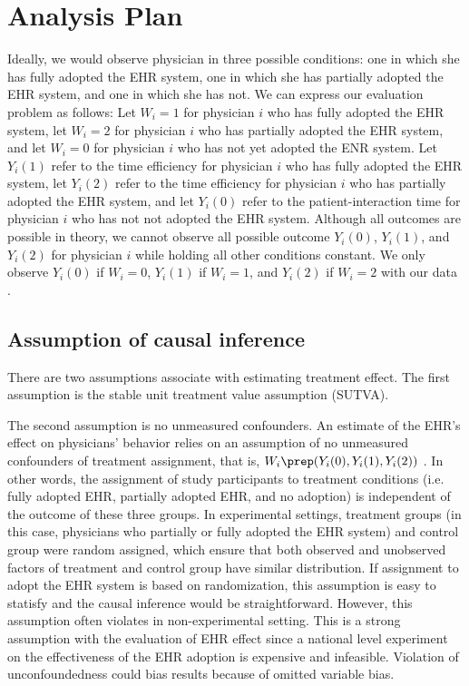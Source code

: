 \section{Analysis Plan}
Ideally, we would observe physician in three possible conditions: one in which she has fully adopted the EHR system, one in which she has partially adopted the EHR system, and one in which she has not. We can express our evaluation problem as follows: Let $W_i = 1$ for physician $i$ who has fully adopted the EHR system, let $W_i = 2$ for physician $i$ who has partially adopted the EHR system, and let $W_i = 0$ for physician $i$ who has not yet adopted the ENR system. Let $Y_i(1)$ refer to the time efficiency for physician $i$ who has fully adopted the EHR system, let $Y_i(2)$ refer to the time efficiency for physician $i$ who has partially adopted the EHR system, and let $Y_i(0)$ refer to the patient-interaction time for physician $i$ who has not not adopted the EHR system. Although all outcomes are possible in theory, we cannot observe all possible outcome $Y_i(0)$, $Y_i(1)$, and $Y_i(2)$ for physician $i$ while holding all other conditions constant. We only observe $Y_i(0)$ if $W_i = 0$, $Y_i(1)$ if $W_i = 1$, and $Y_i(2)$ if $W_i = 2$ with our data \citep{imbens2008recent}.

\subsection{Assumption of causal inference}
There are two assumptions associate with estimating treatment effect. The first assumption is the stable unit treatment value assumption (SUTVA). 

The second assumption is no unmeasured confounders. An estimate of the EHR's effect on physicians' behavior relies on an assumption of no unmeasured confounders of treatment assignment, that is, $W_i \prep (Y_i(0),Y_i(1),Y_i(2))$ \citep{imbens2008recent}. In other words, the assignment of study participants to treatment conditions (i.e. fully adopted EHR, partially adopted EHR, and no adoption) is independent of the outcome of these three groups. In experimental settings, treatment groups (in this case, physicians who partially or fully adopted the EHR system) and control group were random assigned, which ensure that both observed and unobserved factors of treatment and control group have similar distribution. If assignment to adopt the EHR system is based on randomization, this assumption is easy to statisfy and the causal inference would be straightforward. However, this assumption often violates in non-experimental setting. This is a strong assumption with the evaluation of EHR effect since a national level experiment on the effectiveness of the EHR adoption is expensive and infeasible. Violation of unconfoundedness could bias results because of omitted variable bias.

